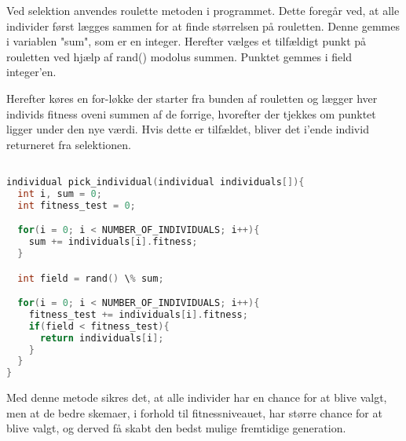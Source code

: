 Ved selektion anvendes roulette metoden i programmet. Dette foregår ved, at alle individer først lægges sammen for at finde størrelsen på rouletten. Denne gemmes i variablen "sum", som er en integer. Herefter vælges et tilfældigt punkt på rouletten ved hjælp af rand() modolus summen. Punktet gemmes i field integer'en.

Herefter køres en for-løkke der starter fra bunden af rouletten og lægger hver individs fitness oveni summen af de forrige, hvorefter der tjekkes om punktet ligger under den nye værdi. Hvis dette er tilfældet, bliver det i'ende individ returneret fra selektionen.  

\begin{lstlisting}[language = c]

individual pick_individual(individual individuals[]){
  int i, sum = 0;
  int fitness_test = 0;

  for(i = 0; i < NUMBER_OF_INDIVIDUALS; i++){
    sum += individuals[i].fitness;
  }

  int field = rand() \% sum;

  for(i = 0; i < NUMBER_OF_INDIVIDUALS; i++){
    fitness_test += individuals[i].fitness;
    if(field < fitness_test){
      return individuals[i];
    }
  }
}

\end{lstlisting}

Med denne metode sikres det, at alle individer har en chance for at blive valgt, men at de bedre skemaer, i forhold til fitnessniveauet, har større chance for at blive valgt, og derved få skabt den bedst mulige fremtidige generation.